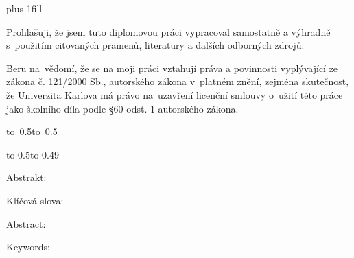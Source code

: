 \newpage



\openright
\hypersetup{pageanchor=true}
\pagestyle{plain}
\vglue 0pt plus 1fill

\noindent
Prohlašuji, že jsem tuto diplomovou práci vypracoval samostatně a výhradně
s~použitím citovaných pramenů, literatury a dalších odborných zdrojů.

\medskip\noindent
Beru na~vědomí, že se na moji práci vztahují práva a povinnosti vyplývající
ze zákona č. 121/2000 Sb., autorského zákona v~platném znění, zejména skutečnost,
že Univerzita Karlova má právo na~uzavření licenční smlouvy o~užití této
práce jako školního díla podle §60 odst. 1 autorského zákona.

\vspace{10mm}

\hbox{\hbox to 0.5\hbox to 0.5}

\vspace{20mm}
\newpage


\openright

\noindent
\Podekovani

\newpage


\openright

\vbox to 0.5\nobreak\vbox to 0.49

\newpage

Abstrakt:
\Abstrakt

\vspace*{3em}

Klíčová slova:
\KlicovaSlova

\newpage

Abstract:
\AbstraktEN

\vspace*{3em}

Keywords:
\KlicovaSlovaEN

\newpage

\openright
\pagestyle{plain}
\setcounter{page}{1}
